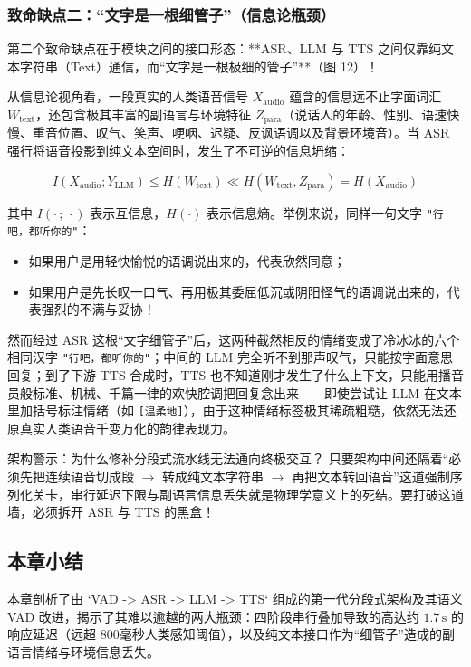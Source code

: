 \documentclass[a4paper]{article}
\begin{document}
\subsubsection{致命缺点二：“文字是一根细管子”（信息论瓶颈）}
第二个致命缺点在于模块之间的接口形态：**ASR、LLM 与 TTS 之间仅靠纯文本字符串（Text）通信，而“文字是一根极细的管子”**（图 12）！

从信息论视角看，一段真实的人类语音信号 $X_{\mathrm{audio}}$ 蕴含的信息远不止字面词汇 $W_{\mathrm{text}}$，还包含极其丰富的副语言与环境特征 $Z_{\mathrm{para}}$（说话人的年龄、性别、语速快慢、重音位置、叹气、笑声、哽咽、迟疑、反讽语调以及背景环境音）。当 ASR 强行将语音投影到纯文本空间时，发生了不可逆的信息坍缩：

\begin{equation}
I(X_{\mathrm{audio}}; Y_{\mathrm{LLM}})
\le H(W_{\mathrm{text}})
\ll H(W_{\mathrm{text}}, Z_{\mathrm{para}}) = H(X_{\mathrm{audio}})
\end{equation}

其中 $I(\cdot\,;\,\cdot)$ 表示互信息，$H(\cdot)$ 表示信息熵。举例来说，同样一句文字 \texttt{"行吧，都听你的"}：
\begin{itemize}
    \item 如果用户是用轻快愉悦的语调说出来的，代表欣然同意；
    \item 如果用户是先长叹一口气、再用极其委屈低沉或阴阳怪气的语调说出来的，代表强烈的不满与妥协！
\end{itemize}
然而经过 ASR 这根“文字细管子”后，这两种截然相反的情绪变成了冷冰冰的六个相同汉字 \texttt{"行吧，都听你的"}；中间的 LLM 完全听不到那声叹气，只能按字面意思回复；到了下游 TTS 合成时，TTS 也不知道刚才发生了什么上下文，只能用播音员般标准、机械、千篇一律的欢快腔调把回复念出来——即使尝试让 LLM 在文本里加括号标注情绪（如 \texttt{[温柔地]}），由于这种情绪标签极其稀疏粗糙，依然无法还原真实人类语音千变万化的韵律表现力。

\begin{warningbox}{架构警示：为什么修补分段式流水线无法通向终极交互？}
只要架构中间还隔着“必须先把连续语音切成段 $\to$ 转成纯文本字符串 $\to$ 再把文本转回语音”这道强制序列化关卡，串行延迟下限与副语言信息丢失就是物理学意义上的死结。要打破这道墙，必须拆开 ASR 与 TTS 的黑盒！
\end{warningbox}

\subsection{本章小结}

本章剖析了由 `VAD -> ASR -> LLM -> TTS` 组成的第一代分段式架构及其语义 VAD 改进，揭示了其难以逾越的两大瓶颈：四阶段串行叠加导致的高达约 $1.7\,\mathrm{s}$ 的响应延迟（远超 800毫秒人类感知阈值），以及纯文本接口作为“细管子”造成的副语言情绪与环境信息丢失。
\end{document}
